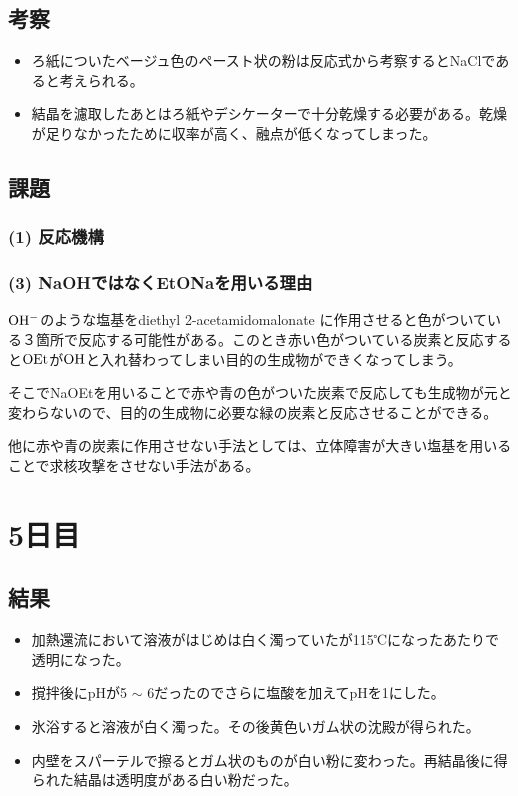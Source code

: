 \subsection*{考察}
\begin{itemize}
\item ろ紙についたベージュ色のペースト状の粉は反応式から考察するとNaClであると考えられる。
\item 結晶を濾取したあとはろ紙やデシケーターで十分乾燥する必要がある。乾燥が足りなかったために収率が高く、融点が低くなってしまった。

\end{itemize}
\subsection*{課題}

\subsubsection*{(1) 反応機構}

\subsubsection*{(3) NaOHではなくEtONaを用いる理由}

$\rm OH^-$のような塩基をdiethyl 2-acetamidomalonate に作用させると色がついている３箇所で反応する可能性がある。このとき赤い色がついている炭素と反応すると$\rm OEt$が$\rm OH$と入れ替わってしまい目的の生成物ができくなってしまう。


そこでNaOEtを用いることで赤や青の色がついた炭素で反応しても生成物が元と変わらないので、目的の生成物に必要な緑の炭素と反応させることができる。


他に赤や青の炭素に作用させない手法としては、立体障害が大きい塩基を用いることで求核攻撃をさせない手法がある。


\section*{5日目}
\subsection*{結果}
\begin{itemize}
\item 加熱還流において溶液がはじめは白く濁っていたが115℃になったあたりで透明になった。
\item 撹拌後にpHが5 $\sim$ 6だったのでさらに塩酸を加えてpHを1にした。
\item 氷浴すると溶液が白く濁った。その後黄色いガム状の沈殿が得られた。
\item 内壁をスパーテルで擦るとガム状のものが白い粉に変わった。再結晶後に得られた結晶は透明度がある白い粉だった。

\end{itemize}
